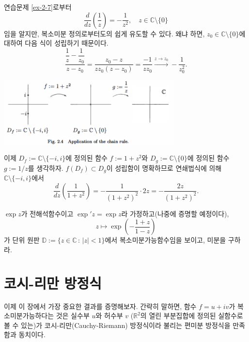 \begin{saltexample}[label=example-2-4]{}{}
연습문제 \ref{ex-2-7}로부터
\[
\dfrac d{dz} \left(\dfrac 1z \right) = - \dfrac 1{z^2}, \quad
z\in \mathbb C \setminus \{0\}
\]
임을 알지만, 복소미분 정의로부터도의 쉽게 유도할 수 있다. 왜냐 하면,
$z_0\in \mathbb C \setminus \{0\}$에 대하여 다음 식이 성립하기 때문이다.
\[
\dfrac{\dfrac 1z - \dfrac1{z_0}}{z-z_0} = \dfrac{z_0 - z}{zz_0(z-z_0)}
= \dfrac{-1}{zz_0} \stackrel{z\to z_0}{\longrightarrow} - \dfrac 1{z_0^2}.
\] 
\begin{center}
\includegraphics[width=0.7\textwidth]{./SaltChapter/fig-2-4}
\end{center}
\label{fig-2-4}
이제 $D_f:=\mathbb C \setminus \{-i,i\}$에 정의된 함수 $f:= 1+z^2$와
$D_g:=\mathbb C \setminus \{0\}$에 정의된 함수 $g:=1/z$를 생각하자.
$f(D_f) \subset D_g$이 성립함이 명확하므로 연쇄법식에 의해
$\mathbb C \setminus \{-i, i\}$에서
\[
\dfrac d{dz} \left( \dfrac 1{1+z^2} \right) = - \dfrac 1{(1+z^2)^2}\cdot 2z
= - \dfrac{2z}{(1+z^2)^2}.
\]
\end{saltexample}

\begin{salt_exercise} \label{ex-2-8}
$\exp z$가 전해석함수이고 $\exp' z = \exp z$라 가정하고(나중에 증명할 예정이다),
\[
z \mapsto \exp \left( - \dfrac{1+z}{1-z} \right)
\]
가 단위 원판 $\mathbb D := \{ z \in \mathbb C \,:\, |z|<1 \}$에서
복소미분가능함수임을 보이고, 미분을 구하라.
\end{salt_exercise}

\section{코시-리만 방정식}

이제 이 장에서 가장 중요한 결과를 증명해보자.
간략히 말하면, 함수  $f=u+iv$가 복소미분가능하다는 것은
실수부 $u$와 허수부 $v$ ($\mathbb R^2$의 열린 부분집합에 정의된 실함수로 볼 수 있는)가
코시-리만(Cauchy-Riemann) 방정식이라 불리는 편미분 방정식을 만족함과 동치이다. 


